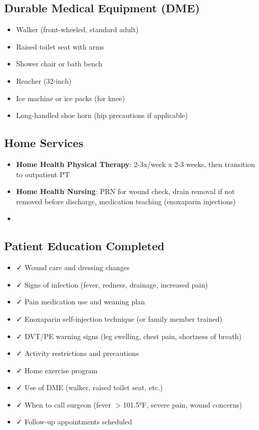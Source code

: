\documentclass[11pt,letterpaper]{article}
\begin{document}
\subsection*{Durable Medical Equipment (DME)}

\begin{itemize}[leftmargin=*]
    \item Walker (front-wheeled, standard adult)
    \item Raised toilet seat with arms
    \item Shower chair or bath bench
    \item Reacher (32-inch)
    \item Ice machine or ice packs (for knee)
    \item Long-handled shoe horn (hip precautions if applicable)
\end{itemize}

\subsection*{Home Services}

\begin{itemize}[leftmargin=*]
    \item \textbf{Home Health Physical Therapy}: 2-3x/week x 2-3 weeks, then transition to outpatient PT
    \item \textbf{Home Health Nursing}: PRN for wound check, drain removal if not removed before discharge, medication teaching (enoxaparin injections)
    \item [If high needs: Home health aide for ADL assistance]
\end{itemize}

\subsection*{Patient Education Completed}

\begin{itemize}[leftmargin=*]
    \item ✓ Wound care and dressing changes
    \item ✓ Signs of infection (fever, redness, drainage, increased pain)
    \item ✓ Pain medication use and weaning plan
    \item ✓ Enoxaparin self-injection technique (or family member trained)
    \item ✓ DVT/PE warning signs (leg swelling, chest pain, shortness of breath)
    \item ✓ Activity restrictions and precautions
    \item ✓ Home exercise program
    \item ✓ Use of DME (walker, raised toilet seat, etc.)
    \item ✓ When to call surgeon (fever $>$101.5°F, severe pain, wound concerns)
    \item ✓ Follow-up appointments scheduled
\end{itemize}
\end{document}

